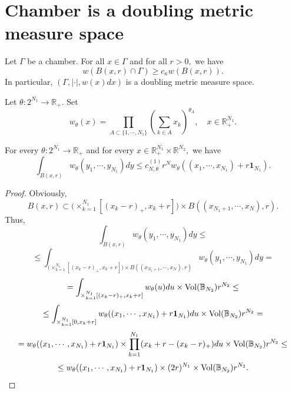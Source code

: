 \documentclass{amsart}
\begin{document}
\section{Chamber is a doubling metric measure space}

\begin{theorem}\label{main:dunkldoubling} Let $\Gamma$ be a chamber. For all $x\in\Gamma$ and for all $r>0,$ we have
$$w(B(x,r)\cap\Gamma)\geq c_{\kappa}w(B(x,r)).$$
In particular, $(\Gamma,|\cdot|,w(x)dx)$ is a doubling metric measure space.
\end{theorem}

\begin{nota} Let $\theta:2^{N_1}\to\mathbb{R}_+.$ Set
$$w_{\theta}(x)=\prod_{A\subset\{1,\cdots,N_1\}}(\sum_{k\in A}x_k)^{\theta_A},\quad x\in\mathbb{R}_+^{N_1}.$$
\end{nota}

\begin{lemma}\label{s2 upper estimate} For every $\theta:2^{N_1}\to\mathbb{R}_+$ and for every $x\in\mathbb{R}^{N_1}_+\times\mathbb{R}^{N_2},$ we have
$$\int_{B(x,r)}w_{\theta}(y_1,\cdots,y_{N_1})dy\leq c_{N,\theta}^{(1)}r^Nw_{\theta}((x_1,\cdots,x_{N_1})+r\mathbf{1}_{N_1}).$$
\end{lemma}
\begin{proof} Obviously,
$$B(x,r)\subset \Big(\times_{k=1}^{N_1}[(x_k-r)_+,x_k+r]\Big)\times B((x_{N_1+1},\cdots,x_N),r).$$
Thus,
$$\int_{B(x,r)}w_{\theta}(y_1,\cdots,y_{N_1})dy\leq$$
$$\leq\int_{\big(\times_{k=1}^{N_1}[(x_k-r)_+,x_k+r]\big)\times B((x_{N_1+1},\cdots,x_N),r)}w_{\theta}(y_1,\cdots,y_{N_1})dy=$$
$$=\int_{\times_{k=1}^{N_1}[(x_k-r)_+,x_k+r]}w_{\theta}(u)du\times {\rm Vol}(\mathbb{B}_{N_2})r^{N_2}\leq$$
$$\leq\int_{\times_{k=1}^{N_1}[0,x_k+r]}w_{\theta}((x_1,\cdots,x_{N_1})+r\mathbf{1}_{N_1})du\times {\rm Vol}(\mathbb{B}_{N_2})r^{N_2}=$$
$$=w_{\theta}((x_1,\cdots,x_{N_1})+r\mathbf{1}_{N_1})\times\prod_{k=1}^{N_1}(x_k+r-(x_k-r)_+)du\times {\rm Vol}(\mathbb{B}_{N_2})r^{N_2}\leq $$
$$\leq w_{\theta}((x_1,\cdots,x_{N_1})+r\mathbf{1}_{N_1})\times(2r)^{N_1}\times {\rm Vol}(\mathbb{B}_{N_2})r^{N_2}.$$
\end{proof}
\end{document}
